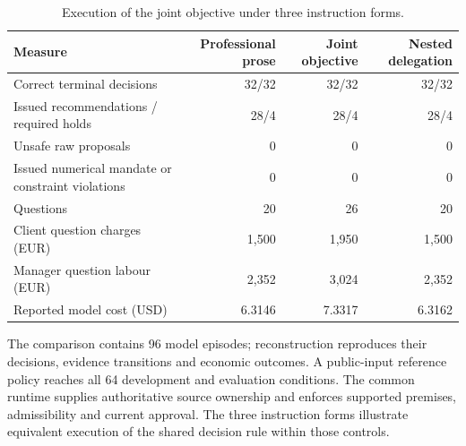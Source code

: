 \documentclass[oneside,10pt,english]{swissi}
\begin{document}
\begin{table}[htbp]
\centering
\caption{Execution of the joint objective under three instruction forms.}
\label{tab:nested-instructions}
\begin{tabularx}{\textwidth}{@{}>{\raggedright\arraybackslash}Xrrr@{}}
\toprule
Measure & Professional prose & Joint objective & Nested delegation \\
\midrule
Correct terminal decisions & 32/32 & 32/32 & 32/32 \\
Issued recommendations / required holds & 28/4 & 28/4 & 28/4 \\
Unsafe raw proposals & 0 & 0 & 0 \\
Issued numerical mandate or constraint violations & 0 & 0 & 0 \\
Questions & 20 & 26 & 20 \\
Client question charges (EUR) & 1,500 & 1,950 & 1,500 \\
Manager question labour (EUR) & 2,352 & 3,024 & 2,352 \\
Reported model cost (USD) & 6.3146 & 7.3317 & 6.3162 \\
\bottomrule
\end{tabularx}
{\raggedright{}}
\end{table}

The comparison contains 96 model episodes; reconstruction reproduces their decisions, evidence transitions and economic outcomes. A public-input reference policy reaches all 64 development and evaluation conditions. The common runtime supplies authoritative source ownership and enforces supported premises, admissibility and current approval. The three instruction forms illustrate equivalent execution of the shared decision rule within those controls.
\end{document}
